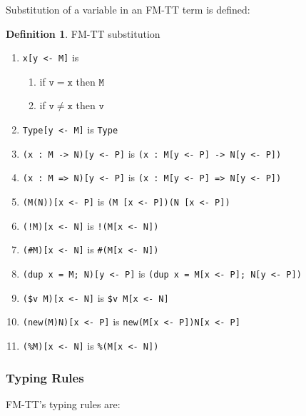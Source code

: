 \documentclass{article}
\theoremstyle{definition}
\newtheorem{definition}{Definition}
\theoremstyle{theorem}
\newcommand\code{\mathtt}
\begin{document}
Substitution of a variable in an FM-TT term is defined:
\begin{definition} FM-TT substitution
  \begin{enumerate}
    \item \verb|x[y <- M]| is
      \begin{enumerate}
        \item if $\code{v} = \code{x}$ then $\code{M}$
        \item if $\code{v} \neq \code{x}$ then $\code{v}$
      \end{enumerate}
    \item \verb|Type[y <- M]| is \verb|Type|
    \item \verb|(x : M -> N)[y <- P]| is \verb|(x : M[y <- P] -> N[y <- P])|
    \item \verb|(x : M => N)[y <- P]| is \verb|(x : M[y <- P] => N[y <- P])|
    \item \verb|(M(N))[x <- P]| is \verb|(M [x <- P])(N [x <- P])|
    \item \verb|(!M)[x <- N]| is \verb|!(M[x <- N])|
    \item \verb|(#M)[x <- N]| is \verb|#(M[x <- N])|
    \item \verb|(dup x = M; N)[y <- P]| is
          \verb|(dup x = M[x <- P]; N[y <- P])|
    \item \verb|($v M)[x <- N]| is \verb|$v M[x <- N]|
    \item \verb|(new(M)N)[x <- P]| is \verb|new(M[x <- P])N[x <- P]|
    \item \verb|(%M)[x <- N]| is \verb|%(M[x <- N])|
  \end{enumerate}
\end{definition}

\subsubsection{Typing Rules}

FM-TT's typing rules are:
\end{document}
